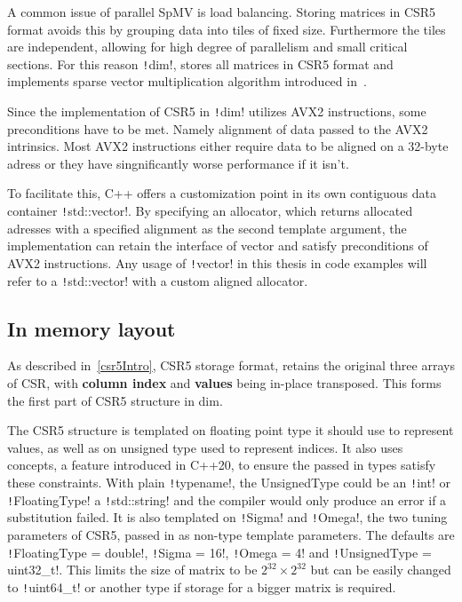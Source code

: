 \documentclass[thesis=M,english]{FITthesis}[2019/12/23]
\newcommand{\csre}[1]{\texttt!#1!}
\begin{document}
A common issue of parallel SpMV is load balancing. Storing matrices in CSR5 format avoids this by
grouping data into tiles of fixed size. Furthermore the tiles are independent, allowing for high
degree of parallelism and small critical sections. For this reason \csre{dim}, stores all matrices in
CSR5 format and implements sparse vector multiplication algorithm introduced in~\cite{liu2015csr5}.

Since the implementation of CSR5 in \csre{dim} utilizes AVX2 instructions, some preconditions have to be met.
Namely alignment of data passed to the AVX2 intrinsics. Most AVX2 instructions either require data to be
aligned on a 32-byte adress or they have singnificantly worse performance if it isn't.

To facilitate this, C++ offers a customization point in its own contiguous data container \csre{std::vector}.
By specifying an allocator, which returns allocated adresses with a specified alignment as the second
template argument, the implementation can retain the interface of vector and satisfy preconditions of
AVX2 instructions. Any usage of \csre{vector} in this thesis in code examples will refer to a \csre{std::vector}
with a custom aligned allocator.

\subsection{In memory layout}

As described in~\ref{csr5Intro}, CSR5 storage format, retains the original three arrays of CSR, with
\textbf{column index} and \textbf{values} being in-place transposed. This forms the first part of
CSR5 structure in dim.

The CSR5 structure is templated on floating point type it should use to represent values,
as well as on unsigned type used to represent indices. It also uses concepts, a feature introduced in
C++20, to ensure the passed in types satisfy these constraints. With plain \csre{typename},
the UnsignedType could be an \csre{int} or \csre{FloatingType} a \csre{std::string} and the compiler
would only produce an error if a substitution failed. It is also templated on \csre{Sigma} and \csre{Omega},
the two tuning parameters of CSR5, passed in as non-type template parameters. The defaults are
\csre{FloatingType = double}, \csre{Sigma = 16}, \csre{Omega = 4} and \csre{UnsignedType = uint32_t}.
This limits the size of matrix to be \(2^{32}\times2^{32}\) but can be easily changed to \csre{uint64_t} or
another type if storage for a bigger matrix is required.
\end{document}
